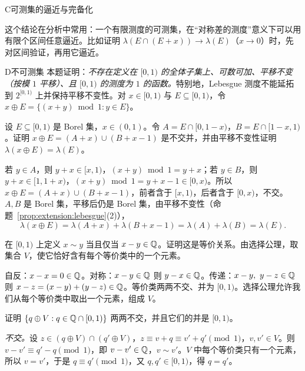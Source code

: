 \begin{probleme}{C}{可测集的逼近与完备化}
\begin{questions}
\begin{solution}
这个结论在分析中常用：一个有限测度的可测集，在“对称差的测度”意义下可以用有限个区间任意逼近。比如证明 $\lambda(E\cap(E+x))\to\lambda(E)$（$x\to0$）时，先对区间验证，再用它逼近。
\end{solution}
\end{questions}
\end{probleme}

\begin{probleme}{D}{不可测集}
本题证明：\emph{不存在定义在 $[0,1)$ 的全体子集上、可数可加、平移不变（按模 $1$ 平移）、且 $[0,1)$ 的测度为 $1$ 的函数。}特别地，Lebesgue 测度不能延拓到 $2^{[0,1)}$ 上并保持平移不变性。对 $x\in[0,1)$ 与 $E\subseteq[0,1)$，令 $x\oplus E=\{(x+y)\bmod1: y\in E\}$。
\begin{questions}
\item 设 $E\subseteq[0,1)$ 是 Borel 集，$x\in(0,1)$。令 $A=E\cap[0,1-x)$，$B=E\cap[1-x,1)$。证明 $x\oplus E=(A+x)\cup(B+x-1)$ 是不交并，并由平移不变性证明 $\lambda(x\oplus E)=\lambda(E)$。
\begin{solution}
若 $y\in A$，则 $y+x\in[x,1)$，$(x+y)\bmod1=y+x$；若 $y\in B$，则 $y+x\in[1,1+x)$，$(x+y)\bmod1=y+x-1\in[0,x)$。所以 $x\oplus E=(A+x)\cup(B+x-1)$，前者含于 $[x,1)$，后者含于 $[0,x)$，不交。$A,B$ 是 Borel 集，平移后仍是 Borel 集，由平移不变性（命题~\ref{prop:extension:lebesgue}(2)），
\[
\lambda(x\oplus E)=\lambda(A+x)+\lambda(B+x-1)=\lambda(A)+\lambda(B)=\lambda(E).
\]
\end{solution}
\item 在 $[0,1)$ 上定义 $x\sim y$ 当且仅当 $x-y\in\mathbb{Q}$。证明这是等价关系。由选择公理，取集合 $V$，使它恰好含有每个等价类中的一个元素。
\begin{solution}
自反：$x-x=0\in\mathbb{Q}$。对称：$x-y\in\mathbb{Q}$ 则 $y-x\in\mathbb{Q}$。传递：$x-y,\ y-z\in\mathbb{Q}$ 则 $x-z=(x-y)+(y-z)\in\mathbb{Q}$。等价类两两不交、并为 $[0,1)$。选择公理允许我们从每个等价类中取出一个元素，组成 $V$。
\end{solution}
\item 证明 $\{q\oplus V: q\in\mathbb{Q}\cap[0,1)\}$ 两两不交，并且它们的并是 $[0,1)$。
\begin{solution}
\emph{不交。}设 $z\in(q\oplus V)\cap(q'\oplus V)$，$z\equiv v+q\equiv v'+q'\pmod1$，$v,v'\in V$。则 $v-v'\equiv q'-q\pmod1$，即 $v-v'\in\mathbb{Q}$，$v\sim v'$。$V$ 中每个等价类只有一个元素，所以 $v=v'$，于是 $q\equiv q'\pmod1$，又 $q,q'\in[0,1)$，得 $q=q'$。


\end{solution}
\end{questions}
\end{probleme}
